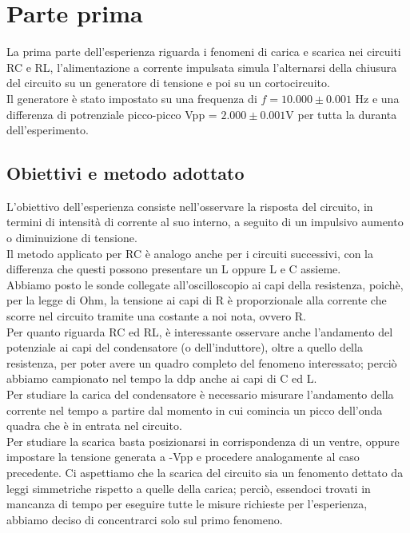 \documentclass[a4paper]{article}
\theoremstyle{definition}
\begin{document}
\section{Parte prima}
La prima parte dell'esperienza riguarda i fenomeni di carica e scarica nei circuiti RC e RL, l'alimentazione a corrente impulsata simula l'alternarsi della chiusura del circuito su un generatore di tensione e poi su un cortocircuito. \\
Il generatore è stato impostato su una frequenza di \(f = 10.000 \pm 0.001\) Hz e una differenza di potrenziale picco-picco Vpp = \(2.000 \pm 0.001\)V per tutta la duranta dell'esperimento.

\subsection{Obiettivi e metodo adottato}
L'obiettivo dell'esperienza consiste nell'osservare la risposta del circuito, in termini di intensità di corrente al suo interno, a seguito di un impulsivo aumento o diminuizione di tensione. \\
Il metodo applicato per RC è analogo anche per i circuiti successivi, con la differenza che questi possono presentare un L oppure L e C assieme. \\
Abbiamo posto le sonde collegate all'oscilloscopio ai capi della resistenza, poichè, per la legge di Ohm, la tensione ai capi di R è proporzionale alla corrente che scorre nel circuito tramite una costante a noi nota, ovvero R.\\
Per quanto riguarda RC ed RL, è interessante osservare anche l'andamento del potenziale ai capi del condensatore (o dell'induttore), oltre a quello della resistenza, per poter avere un quadro completo del fenomeno interessato; perciò abbiamo campionato nel tempo la ddp anche ai capi di C ed L. \\

\noindent Per studiare la carica del condensatore è necessario misurare l'andamento della corrente nel tempo a partire dal momento in cui comincia un picco dell'onda quadra che è in entrata nel circuito.\\
Per studiare la scarica basta posizionarsi in corrispondenza di un ventre, oppure impostare la tensione generata a -Vpp e procedere analogamente al caso precedente. Ci aspettiamo che la scarica del circuito sia un fenomento dettato da leggi simmetriche rispetto a quelle della carica; perciò, essendoci trovati in mancanza di tempo per eseguire tutte le misure richieste per l'esperienza, abbiamo deciso di concentrarci solo sul primo fenomeno. \\
\end{document}

